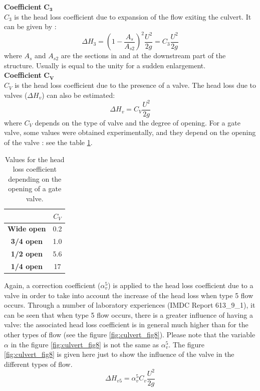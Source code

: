 \textbf{Coefficient} $\mathbf{C_3}$\\
$C_3$ is the head loss coefficient due to expansion of the flow exiting the culvert.
It can be given by \cite{Lencastre1961}:
\begin{equation}
\Delta H_3 = \left(1-\dfrac{A_s}{A_{s2}}\right)^2 \dfrac{U^2}{2g} = C_3\dfrac{U^2}{2g}
\end{equation}
where $A_s$ and $A_{s2}$ are the sections in and at the downstream part of the structure.
Usually is equal to the unity for a sudden enlargement.\\

\textbf{Coefficient} $\mathbf{C_V}$\\
$C_V$ is the head loss coefficient due to the presence of a valve.
The head loss due to valves ($\Delta H_v$) can also be estimated:
\begin{equation}
\Delta H_v = C_V\dfrac{U^2}{2g}
\end{equation}
where $C_V$ depends on the type of valve and the degree of opening.
For a gate valve, some values were obtained experimentally,
and they depend on the opening of the valve \cite{Bruce2000}:
see the table \ref{tab:culvert_tab3}.
\begin{table}[H]
\caption{Values for the head loss coefficient depending on the opening of a gate valve.}
\label{tab:culvert_tab3}
\begin{center}\begin{tabular}{|c|c|}
\hline
~ & $C_V$ \\
\hline
\textbf{Wide open} & 0.2\\
\hline
\textbf{3/4 open} & 1.0 \\
\hline
\textbf{1/2 open} & 5.6 \\
\hline
\textbf{1/4 open} & 17 \\
\hline
\end{tabular}\end{center}
\end{table}

Again, a correction coefficient ($\alpha_v^5$) is applied to the head loss coefficient
due to a valve in order to take into account the increase of the head loss when type 5
flow occurs.
Through a number of laboratory experiences (IMDC Report 613\_9\_1), it can be seen that when
type 5 flow occurs, there is a greater influence of having a valve:
the associated head loss coefficient is in general much higher than for the other types of
flow (see the figure  \ref{fig:culvert_fig8}).
Please note that the variable $\alpha$ in the figure \ref{fig:culvert_fig8}
is not the same as $\alpha_v^5$.
The figure \ref{fig:culvert_fig8} is given here just to show the influence of
the valve in the different types of flow.
\begin{equation}
\Delta H_{v5} = \alpha_v^5 C_v \dfrac{U^2}{2g}
\end{equation}

